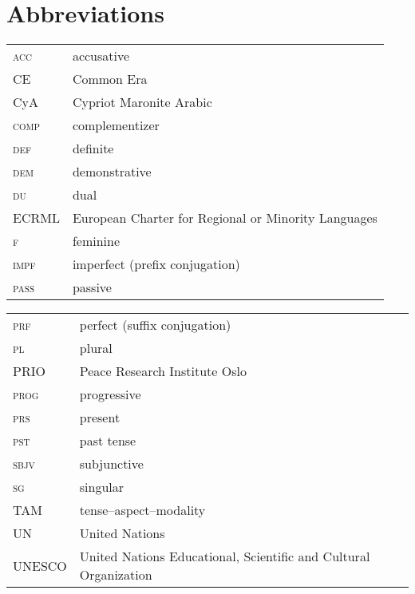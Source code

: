 \documentclass[output=paper]{langsci/langscibook}
\begin{document}
\section*{Abbreviations}
\begin{tabularx}{.5\textwidth}{@{}lQ@{}}
\textsc{acc} & accusative\\
CE & Common Era\\
CyA & Cypriot Maronite Arabic\\
\textsc{comp} & complementizer\\
\textsc{def} & definite\\
\textsc{dem} & demonstrative\\
\textsc{du} & dual\\
ECRML & European Charter for Regional or Minority Languages\\
\textsc{f} & feminine\\
\textsc{impf} & imperfect (prefix conjugation)\\
\textsc{pass} & passive\\
\end{tabularx}%
\begin{tabularx}{.5\textwidth}{@{}lQ@{}}
\textsc{prf} & perfect (suffix conjugation)\\
\textsc{pl} & plural\\
PRIO & Peace Research Institute Oslo\\
\textsc{prog} & progressive \\
\textsc{prs} & present\\
\textsc{pst} & past tense\\
\textsc{sbjv} & subjunctive\\
\textsc{sg} & singular\\
TAM & tense--aspect--modality\\
UN & United Nations\\
UNESCO & United Nations Educational, Scientific and Cultural Organization
\end{tabularx}%


{\sloppy\printbibliography[heading=subbibliography,notkeyword=this]}
\end{document}
